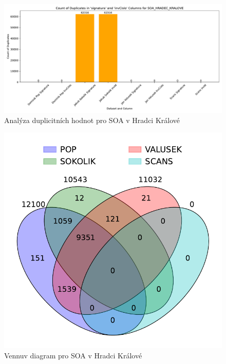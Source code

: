 \begin{figure}[htbp]
\centering
    \includegraphics[scale=.5]{obrazky-figures/dataAnalysis/soaHradecKralove/duplicities.pdf}
    \caption{Analýza duplicitních hodnot pro SOA v Hradci Králové}
\end{figure}

\begin{figure}[htbp]
\centering
    \includegraphics[scale=.5]{obrazky-figures/dataAnalysis/soaHradecKralove/Venn_4.pdf}
    \caption{Vennuv diagram pro SOA v Hradci Králové}
\end{figure}

